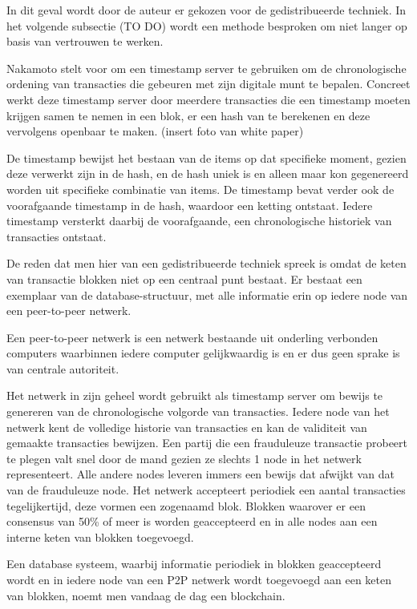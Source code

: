 	In dit geval wordt door de auteur er gekozen voor de gedistribueerde techniek. In het volgende subsectie (TO DO) wordt een methode besproken om niet langer op basis van vertrouwen te werken.
	
	Nakamoto stelt voor om een timestamp server te gebruiken om de chronologische ordening van transacties die gebeuren met zijn digitale munt te bepalen.  Concreet werkt deze timestamp server door meerdere transacties die een timestamp moeten krijgen samen te nemen in een blok, er een hash van te berekenen en deze vervolgens openbaar te maken. (insert foto van white paper)
	
	De timestamp bewijst het bestaan van de items op dat specifieke moment, gezien deze verwerkt zijn in de hash, en de hash uniek is en alleen maar kon gegenereerd worden uit specifieke combinatie van items. De timestamp bevat verder ook de voorafgaande timestamp in de hash, waardoor een ketting ontstaat. Iedere timestamp versterkt daarbij de voorafgaande, een chronologische historiek van transacties ontstaat.
	
	De reden dat men hier van een gedistribueerde techniek spreek is omdat de keten van transactie blokken niet op een centraal punt bestaat. Er bestaat een exemplaar van de database-structuur, met alle informatie erin op iedere node van een peer-to-peer netwerk. 
	
	Een peer-to-peer netwerk is een netwerk bestaande uit onderling verbonden computers waarbinnen iedere computer gelijkwaardig is en er dus geen sprake is van centrale autoriteit. 
	
	Het netwerk in zijn geheel wordt gebruikt als timestamp server om bewijs te genereren van de chronologische volgorde van transacties. Iedere node van het netwerk kent de volledige historie van transacties en kan de validiteit van gemaakte transacties bewijzen. Een partij die een frauduleuze transactie probeert te plegen valt snel door de mand gezien ze slechts 1 node in het netwerk representeert. Alle andere nodes leveren immers een bewijs dat afwijkt van dat van de frauduleuze node. Het netwerk accepteert periodiek een aantal transacties tegelijkertijd, deze vormen een zogenaamd blok. Blokken waarover er een consensus van 50\% of meer is worden geaccepteerd en in alle nodes aan een interne keten van blokken toegevoegd.
	
	Een database systeem, waarbij informatie periodiek in blokken geaccepteerd wordt en in iedere node van een P2P netwerk wordt toegevoegd aan een keten van blokken, noemt men vandaag de dag een blockchain.
	
